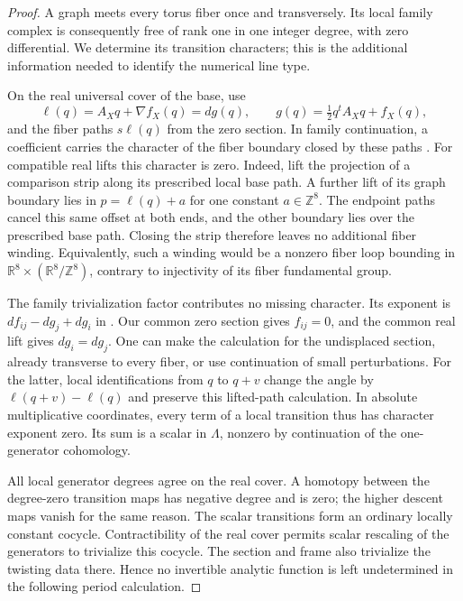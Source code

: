 \documentclass[11pt]{article}
\theoremstyle{definition}
\theoremstyle{remark}
\newcommand{\R}{\mathbb R}
\newcommand{\Z}{\mathbb Z}
\numberwithin{equation}{section}
\begin{document}
\begin{proof}
A graph meets every torus fiber once and transversely.  Its local
family complex is consequently free of rank one in one integer
degree, with zero differential.  We determine its transition
characters; this is the additional information needed to identify
the numerical line type.

On the real universal cover of the base, use
\[
 \ell(q)=A_Xq+\nabla f_X(q)=dg(q),\qquad
 g(q)=\tfrac12q^tA_Xq+f_X(q),
\]
and the fiber paths $s\ell(q)$ from the zero section.  In family
continuation, a coefficient carries the character of the fiber
boundary closed by these paths
\cite[\S\S2.2 and 8.2]{abouzaid-faithful}.  For compatible real lifts
this character is zero.  Indeed, lift the projection of a comparison
strip along its prescribed local base path.  A further lift of its
graph boundary lies in
$p=\ell(q)+a$ for one constant $a\in\Z^8$.  The endpoint paths cancel
this same offset at both ends, and the other boundary lies over the
prescribed base path.  Closing the strip therefore leaves no
additional fiber winding.  Equivalently, such a winding would be a
nonzero fiber loop bounding in
$\R^8\times(\R^8/\Z^8)$, contrary to injectivity of its fiber
fundamental group.

The family trivialization factor contributes no missing character.
Its exponent is $df_{ij}-dg_j+dg_i$ in
\cite[Equation~(8.16)]{abouzaid-faithful}.  Our common zero section
gives $f_{ij}=0$, and the common real lift gives $dg_i=dg_j$.
One can make the calculation for the undisplaced section, already
transverse to every fiber, or use continuation of small perturbations.
For the latter, local identifications from $q$ to $q+v$ change the
angle by $\ell(q+v)-\ell(q)$ and preserve this lifted-path calculation.
In absolute multiplicative coordinates, every term of a local
transition thus has character exponent zero.  Its sum is a scalar
in $\Lambda$, nonzero by continuation of the one-generator
cohomology.

All local generator degrees agree on the real cover.  A homotopy
between the degree-zero transition maps has negative degree and is
zero; the higher descent maps vanish for the same reason.  The
scalar transitions form an ordinary locally constant cocycle.
Contractibility of the real cover permits scalar rescaling of the
generators to trivialize this cocycle.  The section and frame also
trivialize the twisting data there.  Hence no invertible analytic
function is left undetermined in the following period calculation.


\end{proof}
\end{document}
